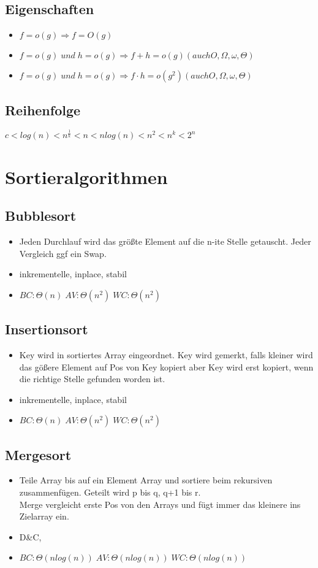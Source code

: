 \documentclass{article}
\begin{document}
\subsection{Eigenschaften}
\begin{itemize}
\item $f = o(g) \Rightarrow f = O(g)$
\item $f = o(g) \; und \;  h = o(g) \Rightarrow f+h = o(g) (auch O, \Omega, \omega, \Theta)$
\item $f = o(g) \; und \;  h = o(g) \Rightarrow f\cdot h = o(g^2) (auch O, \Omega, \omega, \Theta)$
\end{itemize}
\subsection{Reihenfolge}
$c < log(n) < n^{\frac{1}{k}} < n < n log(n) < n^2 < n^k < 2^n$
\section{Sortieralgorithmen}
\subsection {Bubblesort}
\begin{itemize}
\item Jeden Durchlauf wird das gr{\"o}\ss te Element auf die n-ite Stelle getauscht. Jeder Vergleich ggf ein Swap.
\item inkrementelle, inplace, stabil
\item $BC: \Theta(n)\; AV: \Theta(n^2) \; WC: \Theta(n^2)$
\end{itemize}

\subsection{Insertionsort}
\begin{itemize}
\item Key wird in sortiertes Array eingeordnet. Key wird gemerkt, falls kleiner wird das g{\"o}\ss ere Element auf Pos von Key kopiert aber Key wird erst kopiert, wenn die richtige Stelle gefunden worden ist.
\item inkrementelle, inplace, stabil
\item $BC: \Theta(n)\; AV: \Theta(n^2) \; WC: \Theta(n^2)$ 
\end{itemize}

\subsection{Mergesort}
\begin{itemize}
\item Teile Array bis auf ein Element Array und sortiere beim rekursiven zusammenf{\"u}gen. Geteilt wird p bis q, q+1 bis r. \\
Merge vergleicht erste Pos von den Arrays und f{\"u}gt immer das kleinere ins Zielarray ein.
\item D\&C, 
\item $BC: \Theta(nlog(n))\; AV:\Theta(nlog(n))\; WC: \Theta(nlog(n))\;$
\end{itemize}
\end{document}
